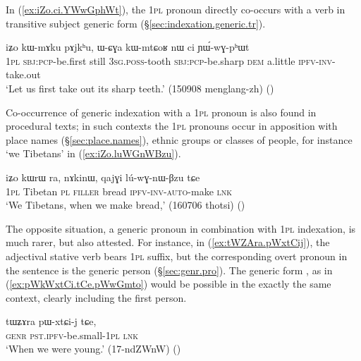 In (\ref{ex:iZo.ci.YWwGphWt}), the \textsc{1pl} pronoun  directly co-occurs with a verb in transitive subject generic form (§\ref{sec:indexation.generic.tr}). 

\begin{exe}
\ex   \label{ex:iZo.ci.YWwGphWt}
 \gll  iʑo kɯ-mɤku pɤjkʰu, ɯ-ɕɣa kɯ-mtɕoʁ nɯ ci ɲɯ́-wɣ-pʰɯt \\
 \textsc{1pl} \textsc{sbj}:\textsc{pcp}-be.first still \textsc{3sg}.\textsc{poss}-tooth \textsc{sbj}:\textsc{pcp}-be.sharp \textsc{dem} a.little \textsc{ipfv}-\textsc{inv}-take.out \\
\glt `Let us first take out its sharp teeth.' (150908 menglang-zh)
()
\end{exe}

Co-occurrence of generic indexation with a \textsc{1pl} pronoun is also found in procedural texts; in such contexts the  \textsc{1pl} pronouns occur in apposition with place names (§\ref{sec:place.names}), ethnic groups or classes of people, for instance  `we Tibetans' in (\ref{ex:iZo.luWGnWBzu}).

\begin{exe}
\ex   \label{ex:iZo.luWGnWBzu}
 \gll iʑo kɯrɯ ra, nɤkinɯ, qajɣi lú-wɣ-nɯ-βzu tɕe \\
\textsc{1pl} Tibetan \textsc{pl} \textsc{filler} bread \textsc{ipfv}-\textsc{inv}-\textsc{auto}-make \textsc{lnk} \\
\glt `We Tibetans, when we make bread,' (160706 thotsi)
()
\end{exe}

The opposite situation, a generic pronoun in combination with \textsc{1pl} indexation, is much rarer, but also attested. For instance, in (\ref{ex:tWZAra.pWxtCij}), the adjectival stative verb  bears \textsc{1pl}  suffix, but the corresponding overt pronoun in the sentence is the generic person  (§\ref{sec:genr.pro}). The generic form , as in (\ref{ex:pWkWxtCi.tCe.pWwGmto}) would be possible in the exactly the same context, clearly including the first person.

\begin{exe}
\ex   \label{ex:tWZAra.pWxtCij}
 \gll tɯʑɤra pɯ-xtɕi-j tɕe, \\
 \textsc{genr} \textsc{pst}.\textsc{ipfv}-be.small-\textsc{1pl} \textsc{lnk} \\
 \glt `When we were young.' (17-ndZWnW) ()
\end{exe}

